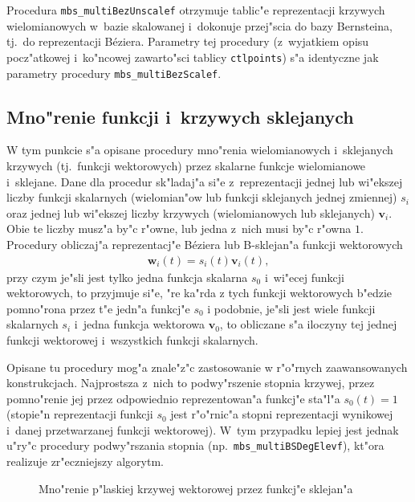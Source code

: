 \vspace{\bigskipamount}
\begin{sloppypar}
Procedura \texttt{mbs\_multiBezUnscalef} otrzymuje tablic"e reprezentacji
krzywych wielomianowych w~bazie skalowanej i~dokonuje przej"scia do bazy
Bernsteina, tj.\ do reprezentacji B\'{e}ziera. Parametry tej procedury
(z~wyjatkiem opisu pocz"atkowej i~ko"ncowej zawarto"sci tablicy
\texttt{ctlpoints}) s"a identyczne jak parametry procedury
\texttt{mbs\_multiBezScalef}.
\end{sloppypar}


\subsection{Mno"renie funkcji i~krzywych sklejanych}

W tym punkcie s"a opisane procedury mno"renia wielomianowych i~sklejanych
krzywych (tj.\ funkcji wektorowych) przez skalarne funkcje wielomianowe
i~sklejane. Dane dla procedur sk"ladaj"a si"e z~reprezentacji jednej lub
wi"ekszej liczby funkcji skalarnych (wielomian"ow lub funkcji sklejanych
jednej zmiennej) $s_i$ oraz jednej lub wi"ekszej liczby krzywych
(wielomianowych lub sklejanych) $\bm{v}_i$. Obie te liczby musz"a by"c
r"owne, lub jedna z~nich musi by"c r"owna $1$. Procedury obliczaj"a
reprezentacj"e B\'{e}ziera lub B-sklejan"a funkcji wektorowych
\begin{align*}
  \bm{w}_i(t) = s_i(t)\bm{v}_i(t),
\end{align*}
przy czym je"sli jest tylko jedna funkcja skalarna $s_0$ i~wi"ecej funkcji
wektorowych, to przyjmuje si"e, "re ka"rda z tych funkcji wektorowych
b"edzie pomno"rona przez t"e jedn"a funkcj"e $s_0$ i podobnie, je"sli jest
wiele funkcji skalarnych $s_i$ i~jedna funkcja wektorowa $\bm{v}_0$, to
obliczane s"a iloczyny tej jednej funkcji wektorowej i~wszystkich funkcji
skalarnych.

Opisane tu procedury mog"a znale"z"c zastosowanie w r"o"rnych zaawansowanych
konstrukcjach. Najprostsza z~nich to podwy"rszenie stopnia krzywej, przez
pomno"renie jej przez odpowiednio reprezentowan"a funkcj"e sta"l"a
$s_0(t)=1$ (stopie"n reprezentacji funkcji $s_0$ jest r"o"rnic"a stopni
reprezentacji wynikowej i~danej przetwarzanej funkcji wektorowej). W~tym
przypadku lepiej jest jednak u"ry"c procedury podwy"rszania
stopnia (np.\ \texttt{mbs\_multiBSDegElevf}), kt"ora realizuje zr"eczniejszy
algorytm.%
\begin{figure}[ht]
  \centerline{}
  \caption{Mno"renie p"laskiej krzywej wektorowej przez funkcj"e sklejan"a}
\end{figure}

